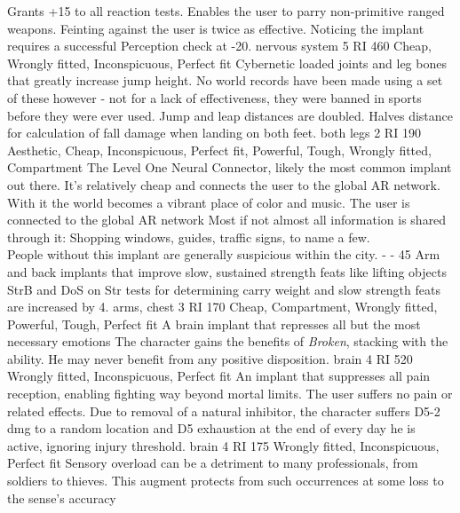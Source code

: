 \begin{multicols}{2}
    {Grants +15 to all reaction tests. Enables the user to parry non-primitive ranged weapons.
	   Feinting against the user is twice as effective.
       Noticing the implant requires a successful Perception check at -20.}
    {nervous system}
    {5 RI}
    {460}
    {Cheap, Wrongly fitted, Inconspicuous, Perfect fit}
    {Cybernetic loaded joints and leg bones that greatly increase jump height. No world records have been made using a set of these however - not for a lack of effectiveness, they were banned in sports before they were ever used.}
    {Jump and leap distances are doubled. Halves distance for calculation of fall damage when landing on both feet.}
    {both legs}
    {2 RI}
    {190}
    {Aesthetic, Cheap, Inconspicuous, Perfect fit, Powerful, Tough, Wrongly fitted, Compartment}
	{
		\label{implant:l1nc}
	The Level One Neural Connector, likely the most common implant out there.
	It's relatively cheap and connects the user to the global AR network.
	With it the world becomes a vibrant place of color and music.}
	{The user is connected to the global AR network
	Most if not almost all information is shared through it:
	Shopping windows,
		guides,
		traffic signs,
		to name a few.
	\\%
	People without this implant are generally suspicious within the city.
	}
	{-}
	{-}
	{45}
	{}
    {Arm and back implants that improve slow, sustained strength feats like lifting objects}
    {StrB and DoS on Str tests for determining carry weight and slow strength feats are increased by 4.}
    {arms, chest}
    {3 RI}
    {170}
    {Cheap, Compartment, Wrongly fitted, Powerful, Tough, Perfect fit}
    {A brain implant that represses all but the most necessary emotions}
    {The character gains the benefits of \emph{Broken}, stacking with the ability. He may never benefit from any positive disposition.}
    {brain}
    {4 RI}
    {520}
    {Wrongly fitted, Inconspicuous, Perfect fit}
    {An implant that suppresses all pain reception, enabling fighting way beyond mortal limits.}
    {The user suffers no pain or related effects.
	   Due to removal of a natural inhibitor, the character suffers D5-2 dmg to a random location and D5 exhaustion at the end of every day he is active, ignoring injury threshold.}
    {brain}
    {4 RI}
    {175}
    {Wrongly fitted, Inconspicuous, Perfect fit}
    {Sensory overload can be a detriment to many professionals, from soldiers to thieves. This augment protects from such occurrences at some loss to the sense's accuracy}

\end{multicols}
